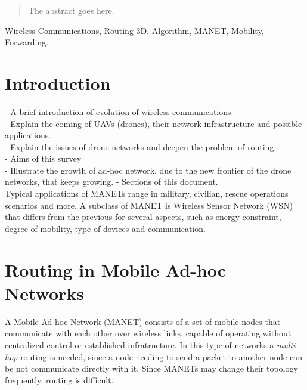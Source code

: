 \documentclass[journal,comsoc]{IEEEtran}
\begin{document}







\maketitle

\begin{abstract}
The abstract goes here.
\end{abstract}

\begin{IEEEkeywords}
Wireless Communications, Routing 3D, Algorithm, MANET, Mobility, Forwarding.
\end{IEEEkeywords}

\IEEEpeerreviewmaketitle



\section{Introduction}
- A brief introduction of evolution of wireless communications.\\
- Explain the coming of UAVs (drones), their network infrastructure and possible applications.\\
- Explain the issues of drone networks and deepen the problem of routing.\\
- Aims of this survey\\
- Illustrate the growth of ad-hoc network, due to the new frontier of the drone networks, that keeps growing.
- Sections of this document.\\
Typical applications of MANETs range in military, civilian, rescue operations scenarios and more. A subclass of MANET is Wireless Sensor Network (WSN) that differs from the previous for several aspects, such as energy constraint, degree of mobility, type of devices and communication.

\section{Routing in Mobile Ad-hoc Networks}
A Mobile Ad-hoc Network (MANET) consists of a set of mobile nodes that communicate with each other over wireless links, capable of operating without centralized control or established infratructure. In this type of networks a \emph{multi-hop} routing is needed, since a node needing to send a packet to another node can be not communicate directly with it. Since MANETs may change their topology frequently, routing is difficult.\\\\
\end{document}

